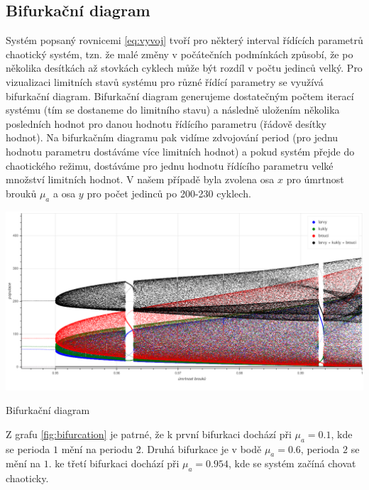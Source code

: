 \documentclass[a4paper, 12pt]{article}
\newlength\figureheight
\newlength\figurewidth
\begin{document}
\subsection{Bifurkační diagram}
Systém popsaný rovnicemi \ref{eq:vyvoj} tvoří pro některý interval řídících parametrů chaotický systém, tzn. že malé změny v počátečních podmínkách způsobí, že po několika desítkách až stovkách cyklech může být rozdíl v počtu jedinců velký. Pro vizualizaci limitních stavů systému pro různé řídící parametry se využívá bifurkační diagram. Bifurkační diagram generujeme dostatečným počtem iterací systému (tím se dostaneme do limitního stavu) a následně uložením několika posledních hodnot pro danou hodnotu řídícího parametru (řádově desítky hodnot). Na bifurkačním diagramu pak vidíme zdvojování period (pro jednu hodnotu parametru dostáváme více limitních hodnot) a pokud systém přejde do chaotického režimu, dostáváme pro jednu hodnotu řídícího parametru velké množství limitních hodnot. V našem případě byla zvolena osa $x$ pro úmrtnost brouků $\mu_a$ a osa $y$ pro počet jedinců po 200-230 cyklech.
\begin{graph}[H]
	\centering
\includegraphics[width=\textwidth]{grafy/bifurcation.png}
\vspace{-10pt}
\caption{Bifurkační diagram}
\label{fig:bifurcation}
\end{graph}


Z grafu \ref{fig:bifurcation} je patrné, že k první bifurkaci dochází při $\mu_a=0.1$, kde se perioda $1$ mění na periodu $2$. Druhá bifurkace je v bodě $\mu_a=0.6$, perioda $2$ se mění na $1$. ke třetí bifurkaci dochází při $\mu_a=0.954$, kde se systém začíná chovat chaoticky.
\end{document}
